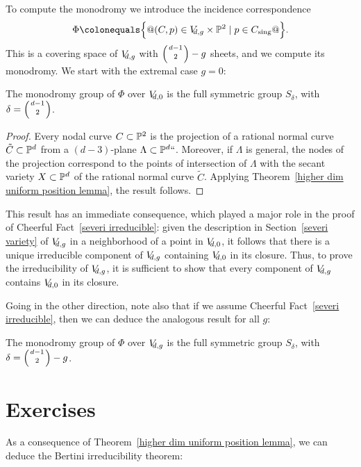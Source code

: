 To compute the monodromy we introduce the incidence correspondence
$$
\Phi \colonequals \big\{@(C, p) \in \VD{g} \times \PP^2 \mid p \in C_{\sing}
@\big\}.
$$
This is a
covering space of $\VD{g}$
with $\tbinom{d-1}{2} - \nobreak g$ sheets,
and we compute its
monodromy. We start with the extremal case $g = 0$:

\begin{proposition}
The monodromy group of $\Phi$ over $\VD{0}$ is the full symmetric group
\label{plane curve nodes}
$S_\delta$, with $\delta = \tbinom{d-1}{2}$.
\end{proposition}

\begin{proof}
Every
nodal curve
%
$C \subset \PP^2$ is the projection of a
rational normal curve
%
$\tilde C \subset \PP^d$ from a $(d-3)$-plane
$\Lambda \subset \PP^d` `$. Moreover, if $\Lambda$ is general,  the nodes
of the projection correspond to the points of intersection of $\Lambda$
with the
secant variety
%
$X \subset \PP^d$ of the rational normal curve
$\tilde C$. Applying Theorem~\ref{higher dim uniform position lemma},
the result follows.
\end{proof}

This result has an immediate consequence, which played a major role in the
proof of Cheerful Fact~\ref{severi irreducible}: given the description in
Section~\ref{severi variety} of $\VD{g}$ in a neighborhood of a point
in $\VD{0}$, it follows that there is a unique irreducible component
of $\VD{g}$ containing $\VD{0}$ in its closure. Thus, to prove the
irreducibility of $\VD{g}$, it is sufficient to show that every component
of $\VD{g}$ contains $\VD{0}$ in its closure.

Going in the other direction, note also that if we assume Cheerful
Fact~\ref{severi irreducible}, then we can deduce the analogous result
for all $g$:

\begin{proposition}
The monodromy group of $\Phi$ over $\VD{g}$ is the full symmetric group
$S_\delta$, with $\delta = \tbinom{d-1}{2} - g$.
\end{proposition}

\section{Exercises}

As a consequence of Theorem~\ref{higher dim uniform position lemma},
we can deduce the
Bertini irreducibility theorem:
%

